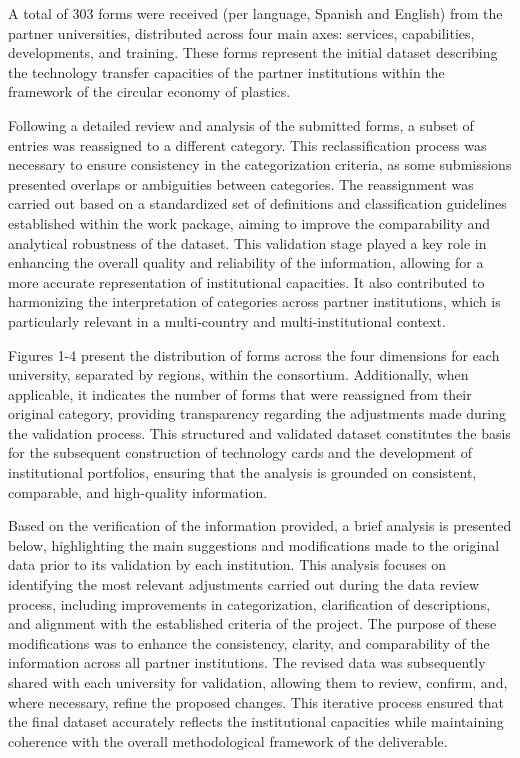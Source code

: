 \documentclass[
  12pt,
  oneside]{book}
\begin{document}
A total of 303 forms were received (per language, Spanish and English)
from the partner universities, distributed across four main axes:
services, capabilities, developments, and training. These forms
represent the initial dataset describing the technology transfer
capacities of the partner institutions within the framework of the
circular economy of plastics.

Following a detailed review and analysis of the submitted forms, a
subset of entries was reassigned to a different category. This
reclassification process was necessary to ensure consistency in the
categorization criteria, as some submissions presented overlaps or
ambiguities between categories. The reassignment was carried out based
on a standardized set of definitions and classification guidelines
established within the work package, aiming to improve the comparability
and analytical robustness of the dataset. This validation stage played a
key role in enhancing the overall quality and reliability of the
information, allowing for a more accurate representation of
institutional capacities. It also contributed to harmonizing the
interpretation of categories across partner institutions, which is
particularly relevant in a multi-country and multi-institutional
context.

Figures 1-4 present the distribution of forms across the four dimensions
for each university, separated by regions, within the consortium.
Additionally, when applicable, it indicates the number of forms that
were reassigned from their original category, providing transparency
regarding the adjustments made during the validation process. This
structured and validated dataset constitutes the basis for the
subsequent construction of technology cards and the development of
institutional portfolios, ensuring that the analysis is grounded on
consistent, comparable, and high-quality information.

Based on the verification of the information provided, a brief analysis
is presented below, highlighting the main suggestions and modifications
made to the original data prior to its validation by each institution.
This analysis focuses on identifying the most relevant adjustments
carried out during the data review process, including improvements in
categorization, clarification of descriptions, and alignment with the
established criteria of the project. The purpose of these modifications
was to enhance the consistency, clarity, and comparability of the
information across all partner institutions. The revised data was
subsequently shared with each university for validation, allowing them
to review, confirm, and, where necessary, refine the proposed changes.
This iterative process ensured that the final dataset accurately
reflects the institutional capacities while maintaining coherence with
the overall methodological framework of the deliverable.
\end{document}
